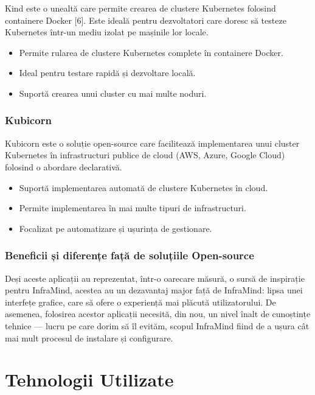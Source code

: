 \documentclass[12pt,a4paper]{report}
\begin{document}
Kind este o unealtă care permite crearea de clustere Kubernetes folosind containere Docker [6]. Este ideală pentru dezvoltatori care doresc să testeze Kubernetes într-un mediu izolat pe mașinile lor locale.

\begin{itemize}
  \item Permite rularea de clustere Kubernetes complete în containere Docker.
  \item Ideal pentru testare rapidă și dezvoltare locală.
  \item Suportă crearea unui cluster cu mai multe noduri.
\end{itemize}

\subsection{Kubicorn}

Kubicorn este o soluție open-source care facilitează implementarea unui cluster Kubernetes în infrastructuri publice de cloud (AWS, Azure, Google Cloud) folosind o abordare declarativă.

\begin{itemize}
  \item Suportă implementarea automată de clustere Kubernetes în cloud.
  \item Permite implementarea în mai multe tipuri de infrastructuri.
  \item Focalizat pe automatizare și ușurința de gestionare.
\end{itemize}

\subsection{Beneficii și diferențe față de soluțiile Open-source}

Deși aceste aplicații au reprezentat, într-o oarecare măsură, o sursă de inspirație pentru InfraMind, acestea au un dezavantaj major față de InfraMind: lipsa unei interfețe grafice, care să ofere o experiență mai plăcută utilizatorului. De asemenea, folosirea acestor aplicații necesită, din nou, un nivel înalt de cunoștințe tehnice — lucru pe care dorim să îl evităm, scopul InfraMind fiind de a ușura cât mai mult procesul de instalare și configurare.

\chapter{Tehnologii Utilizate}
\label{cap:tehnologii}
\end{document}
